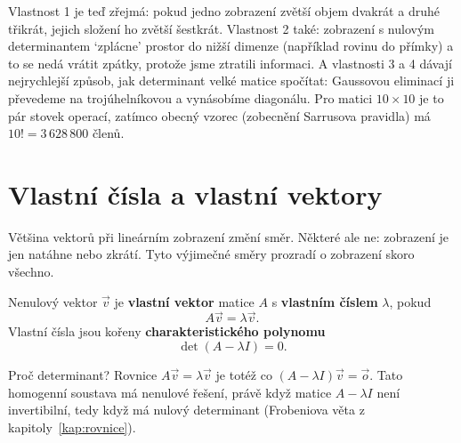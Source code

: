 Vlastnost 1 je teď zřejmá: pokud jedno zobrazení zvětší objem dvakrát a druhé třikrát, jejich složení ho zvětší šestkrát. Vlastnost 2 také: zobrazení s nulovým determinantem `zplácne' prostor do nižší dimenze (například rovinu do přímky) a to se nedá vrátit zpátky, protože jsme ztratili informaci. A vlastnosti 3 a 4 dávají nejrychlejší způsob, jak determinant velké matice spočítat: Gaussovou eliminací ji převedeme na trojúhelníkovou a vynásobíme diagonálu. Pro matici $10\times 10$ je to pár stovek operací, zatímco obecný vzorec (zobecnění Sarrusova pravidla) má $10! = 3\,628\,800$ členů.

\section{Vlastní čísla a vlastní vektory}

Většina vektorů při lineárním zobrazení změní směr. Některé ale ne: zobrazení je jen natáhne nebo zkrátí. Tyto výjimečné směry prozradí o zobrazení skoro všechno.

\begin{definitionbox}
  Nenulový vektor $\vec{v}$ je \textbf{vlastní vektor} matice $A$ s \textbf{vlastním číslem} $\lambda$, pokud
  \begin{equation*}
    A\vec{v} = \lambda\vec{v}.
  \end{equation*}
  Vlastní čísla jsou kořeny \textbf{charakteristického polynomu}
  \begin{equation*}
    \det(A - \lambda I) = 0.
  \end{equation*}
\end{definitionbox}

Proč determinant? Rovnice $A\vec{v} = \lambda\vec{v}$ je totéž co $(A - \lambda I)\vec{v} = \vec{o}$. Tato homogenní soustava má nenulové řešení, právě když matice $A - \lambda I$ není invertibilní, tedy když má nulový determinant (Frobeniova věta z kapitoly~\ref{kap:rovnice}).

